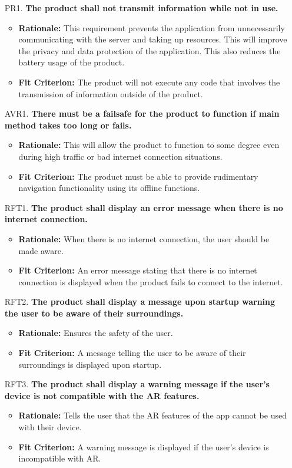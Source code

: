 \documentclass{article}
\begin{document}
\begin{itemize}
        \item[PR1.] \textbf{The product shall not transmit information while not in use.}
    \begin{itemize}
        \item \textbf{Rationale:} This requirement prevents the application from unnecessarily communicating with the server and taking up resources. This will improve the privacy and data protection of the application. This also reduces the battery usage of the product.
        \item \textbf{Fit Criterion:} The product will not execute any code that involves the transmission of information outside of the product.
    \end{itemize}
    \item[AVR1.] \textbf{There must be a failsafe for the product to function if main method takes too long or fails.}
    \begin{itemize}
        \item \textbf{Rationale:} This will allow the product to function to some degree even during high traffic or bad internet connection situations.
        \item \textbf{Fit Criterion:} The product must be able to provide rudimentary navigation functionality using its offline functions.
    \end{itemize}
    \item[RFT1.] \textbf{The product shall display an error message when there is no internet connection.}
    \begin{itemize}
        \item \textbf{Rationale:} When there is no internet connection, the user should be made aware.
        \item \textbf{Fit Criterion:} An error message stating that there is no internet connection is displayed when the product fails to connect to the internet.
    \end{itemize}
    \item[RFT2.] \textbf{The product shall display a message upon startup warning the user to be aware of their surroundings.}
    \begin{itemize}
        \item \textbf{Rationale:} Ensures the safety of the user.
        \item \textbf{Fit Criterion:} A message telling the user to be aware of their surroundings is displayed upon startup.
    \end{itemize}
    \item[RFT3.] \textbf{The product shall display a warning message if the user's device is not compatible with the AR features.}
    \begin{itemize}
        \item \textbf{Rationale:} Tells the user that the AR features of the app cannot be used with their device.
        \item \textbf{Fit Criterion:} A warning message is displayed if the user's device is incompatible with AR.
    \end{itemize}
\end{itemize}
\end{document}
